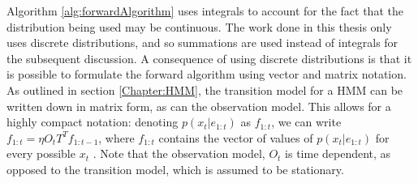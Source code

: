 
Algorithm \ref{alg:forwardAlgorithm} uses integrals to account for the fact that the distribution being used may be continuous. The work done in this thesis only uses discrete distributions, and so summations are used instead of integrals for the subsequent discussion. A consequence of using discrete distributions is that it is possible to formulate the forward algorithm using vector and matrix notation. As outlined in section \ref{Chapter:HMM}, the transition model for a HMM can be written down in matrix form, as can the observation model. This allows for a highly compact notation: denoting $p(x_t | e_{1:t})$ as $f_{1:t}$, we can write $f_{1:t} = \eta O_{t} T^{T} f_{1:t-1}$, where $f_{1:t}$ contains the vector of values of $p(x_t | e_{1:t})$ for every possible $x_t$ \cite[p.~579]{AIAMA}. Note that the observation model, $O_t$ is time dependent, as opposed to the transition model, which is assumed to be stationary. \par

